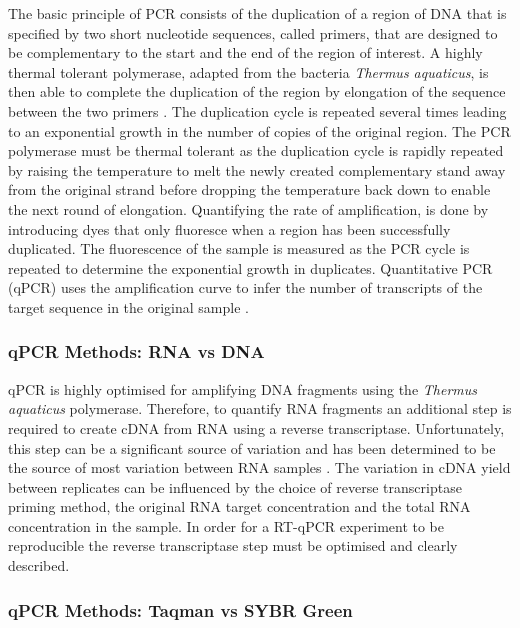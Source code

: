 \documentclass[../main.tex]{subfiles}
\begin{document}
The basic principle of PCR consists of the duplication of a region of DNA that is specified by two short nucleotide sequences, called primers, that are designed to be complementary to the start and the end of the region of interest. 
A highly thermal tolerant polymerase, adapted from the bacteria \textit{Thermus aquaticus}, is then able to complete the duplication of the region by elongation of the sequence between the two primers \parencite{Saiki1988}.
The duplication cycle is repeated several times leading to an exponential growth in the number of copies of the original region.
The PCR polymerase must be thermal tolerant as the duplication cycle is rapidly repeated by raising the temperature to melt the newly created complementary stand away from the original strand before dropping the temperature back down to enable the next round of elongation. 
Quantifying the rate of amplification, is done by introducing dyes that only fluoresce when a region has been successfully duplicated. 
The fluorescence of the sample is measured as the PCR cycle is repeated to determine the exponential growth in duplicates.
Quantitative PCR (qPCR) uses the amplification curve to infer the number of transcripts of the target sequence in the original sample \parencite{Holland1991}.

\subsubsection{qPCR Methods: RNA vs DNA}

qPCR is highly optimised for amplifying DNA fragments using the \textit{Thermus aquaticus} polymerase. 
Therefore, to quantify RNA fragments an additional step is required to create cDNA from RNA using a reverse transcriptase. 
Unfortunately, this step can be a significant source of variation and has been determined to be the source of most variation between RNA samples \parencite{Stahlberg2004}. 
The variation in cDNA yield between replicates can be influenced by the choice of reverse transcriptase priming method, the original RNA target concentration and the total RNA concentration in the sample. 
In order for a RT-qPCR experiment to be reproducible the reverse transcriptase step must be optimised and clearly described. 

\subsubsection{qPCR Methods: Taqman vs SYBR Green}
\end{document}

